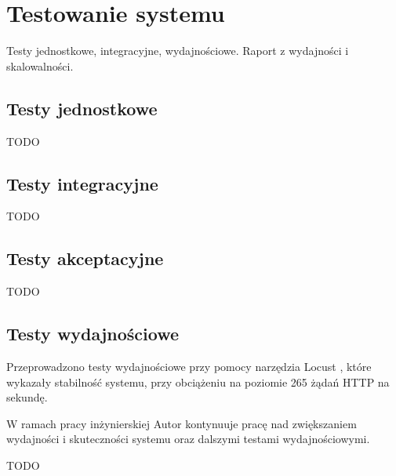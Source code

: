 \clearpage %

\section{Testowanie systemu}

Testy jednostkowe, integracyjne, wydajnościowe. Raport z wydajności i skalowalności.

\subsection{Testy jednostkowe}

TODO

\subsection{Testy integracyjne}

TODO

\subsection{Testy akceptacyjne}

TODO

\subsection{Testy wydajnościowe}

Przeprowadzono testy wydajnościowe przy pomocy narzędzia Locust \cite{locust}, które wykazały stabilność systemu, przy obciążeniu na poziomie 265 żądań HTTP na sekundę.

W ramach pracy inżynierskiej Autor kontynuuje pracę nad zwiększaniem wydajności i skuteczności systemu oraz dalszymi testami wydajnościowymi.

TODO
